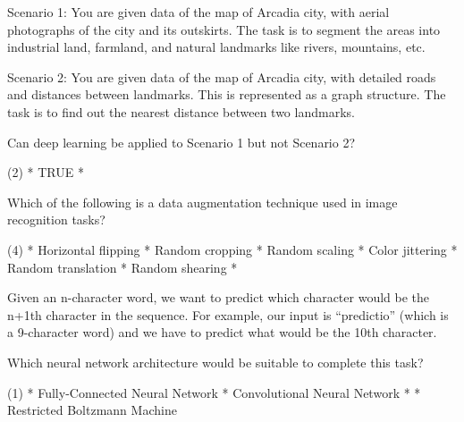 \documentclass[10pt]{extarticle}
\begin{document}
\begin{exercise}
    Scenario 1: You are given data of the map of Arcadia city, with aerial photographs of the city and its outskirts. The task is to segment the areas into industrial land, farmland, and natural landmarks like rivers, mountains, etc.

    Scenario 2: You are given data of the map of Arcadia city, with detailed roads and distances between landmarks. This is represented as a graph structure. The task is to find out the nearest distance between two landmarks.

    \noindent Can deep learning be applied to Scenario 1 but not Scenario 2?
    \begin{choice} (2)
        * TRUE
        *
    \end{choice}
\end{exercise}
\begin{solution}
\end{solution}

\begin{exercise}
    Which of the following is a data augmentation technique used in image recognition tasks?
    \begin{choice} (4)
        * Horizontal flipping
        * Random cropping
        * Random scaling
        * Color jittering
        * Random translation
        * Random shearing
        *
    \end{choice}
\end{exercise}
\begin{solution}
\end{solution}

\begin{exercise}
    Given an n-character word, we want to predict which character would be the n+1th character in the sequence. For example, our input is “predictio” (which is a 9-character word) and we have to predict what would be the 10th character.

    Which neural network architecture would be suitable to complete this task?
    \begin{choice} (1)
        * Fully-Connected Neural Network
        * Convolutional Neural Network
        *
        * Restricted Boltzmann Machine
    \end{choice}
\end{exercise}
\begin{solution}
\end{solution}
\end{document}
